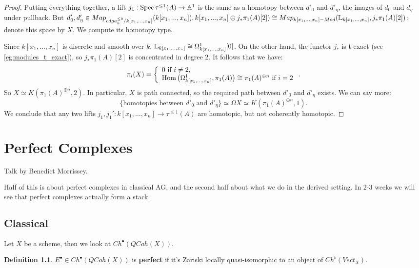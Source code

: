 \documentclass[10pt,a4paper,reqno,oneside]{book} %
\theoremstyle{plain}
\theoremstyle{definition}
\newtheorem{defin}[thm]{Definition}
\theoremstyle{remark}
\numberwithin{equation}{section}
\begin{document}
\begin{proof}
Putting everything together, a lift $j_1 : \operatorname{Spec} \tau^{\leq 1}(A) \to \mathbb A^1$ is the same as a homotopy between $d'_0$
and $ d'_{\eta}$, the images of $d_0$ and $d_{\eta}$ under pullback. 
But $d'_{0},d'_{\eta} \in Map_{cdga_k^{\leq 0} / k[x_{1},...,x_{n}]}(k[x_{1},...,x_{n}]), k[x_{1},...,x_{n}]\oplus 
j_{*}\pi_{1}(A)[2])\cong Map_{k[x_{1},...,x_{n}]-Mod}(\mathbb L_{k[x_{1},...,x_{n}]}, j_{*}\pi_{1}(A)[2])$; denote this space
by $X$. We compute its homotopy type. 

Since $k[x_1, \dots, x_n]$ is discrete and smooth over $k$, $\mathbb L_{k[x_1, \dots, x_n]} \cong \Omega^1_{k[x_1, \dots, x_n]}[0]$.
On the other hand, the functor $j_*$ is t-exact (see \ref{eg:modules_t_exact}), so $j_* \pi_1(A)[2]$ is concentrated in degree 2.
It follows that we have:
\[	\pi_i(X) = \left\{ \begin{array} {l} 0 \text{ if } i \neq 2, \\ 
\operatorname{Hom}\big(\Omega^1_{k[x_1, \dots, x_n]}, \pi_1(A)\big) \cong \pi_1(A)^{\oplus n} \text{ if } i = 2 \end{array}\right. .	\]
So $X \simeq K(\pi_1(A)^{\oplus n}, 2)$. In particular, $X$ is path connected, so the required path between $d'_0$ and $d'_{\eta}$
exists. We can say more:
\[	\{ \text{homotopies between } d'_0 \text{ and } d'_{\eta} \} \simeq \Omega X \simeq K(\pi_1(A)^{\oplus n}, 1).	\]
We conclude that any two lifts $j_1, j_1' : k[x_1, \dots, x_n] \to \tau^{\leq 1}(A)$ are homotopic, but not coherently
homotopic.
\end{proof}



\chapter{Perfect Complexes}
Talk by Benedict Morrissey.

Half of this is about perfect complexes in classical AG, and the second half about what we do in the derived setting. 
In 2-3 weeks we will see that perfect complexes actually form a stack.

\section{Classical}
\label{sect:perf_classical}

Let $X$ be a scheme, then we look at $Ch^{\bullet}(QCoh(X))$.

\begin{defin}
$E^{\bullet} \in Ch^{\bullet}(QCoh(X))$ is \textbf{perfect} if it's Zariski locally quasi-isomorphic to an object
of $Ch^b(Vect_X)$. 
\end{defin}
\end{document}
